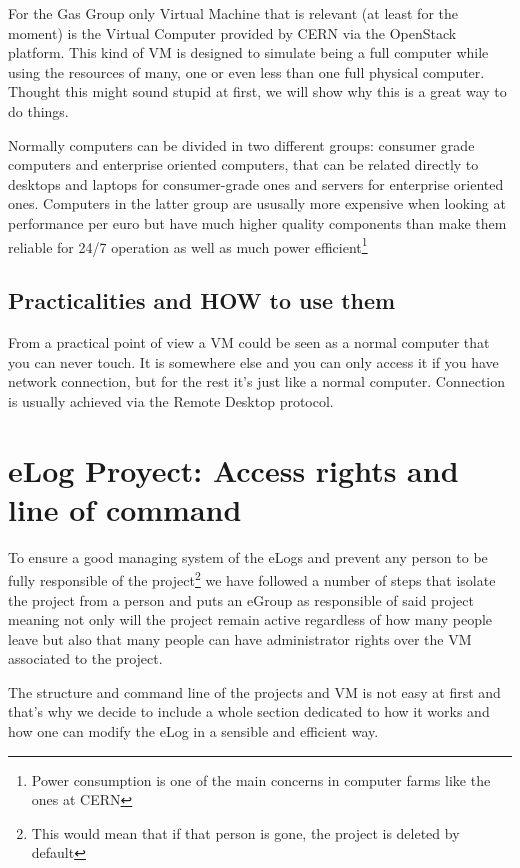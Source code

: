 \documentclass[runningheads,a4paper]{llncs}
\begin{document}
For the Gas Group only Virtual Machine that is relevant (at least for the moment) is the Virtual Computer provided by CERN via the OpenStack platform. This kind of VM is designed to simulate being a full computer while using the resources of many, one or even less than one full physical computer. Thought this might sound stupid at first, we will show why this is a great way to do things.

Normally computers can be divided in two different groups: consumer grade computers and enterprise oriented computers, that can be related directly to desktops and laptops for consumer-grade ones and servers for enterprise oriented ones. Computers in the latter group are ususally more expensive when looking at performance per euro but have much higher quality components than make them reliable for 24/7 operation as well as much power efficient\footnote{Power consumption is one of the main concerns in computer farms like the ones at CERN}


\subsection{Practicalities and HOW to use them}

From a practical point of view a VM could be seen as a normal computer that you can never touch. It is somewhere else and you can only access it if you have network connection, but for the rest it's just like a normal computer. Connection is usually achieved via the Remote Desktop protocol.

\section{eLog Proyect: Access rights and line of command}

To ensure a good managing system of the eLogs and prevent any person to be fully responsible of the project\footnote{This would mean that if that person is gone, the project is deleted by default} we have followed a number of steps that isolate the project from a person and puts an eGroup as responsible of said project meaning not only will the project remain active regardless of how many people leave but also that many people can have administrator rights over the VM associated to the project.

The structure and command line of the projects and VM is not easy at first and that's why we decide to include a whole section dedicated to how it works and how one can modify the eLog in a sensible and efficient way.
\end{document}
